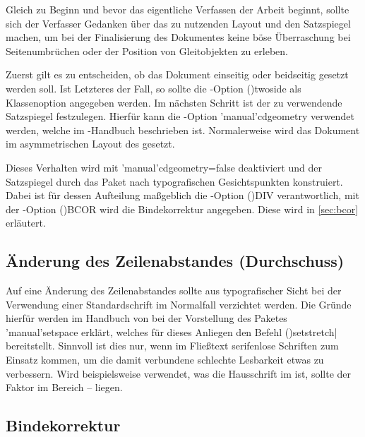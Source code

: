 \documentclass[%
  english,ngerman,%
  cdgeometry=no,DIV=12,%
  cd=false,cdfont=false,cdtitle=true,%
  headings=normal,%
  automark,%
  listof=toc,%
]{tudscrartcl}
\begin{document}
Gleich zu Beginn und bevor das eigentliche Verfassen der Arbeit beginnt, sollte 
sich der Verfasser Gedanken über das zu nutzenden Layout und den Satzspiegel 
machen, um bei der Finalisierung des Dokumentes keine böse Überraschung bei 
Seitenumbrüchen oder der Position von Gleitobjekten zu erleben.

Zuerst gilt es zu entscheiden, ob das Dokument einseitig oder beidseitig 
gesetzt werden soll. Ist Letzteres der Fall, so sollte die \KOMAScript-Option 
\Option(){twoside} als Klassenoption angegeben werden. Im 
nächsten Schritt ist der zu verwendende Satzspiegel festzulegen. Hierfür kann 
die \TUDScript-Option \Option'manual'{cdgeometry} verwendet werden, welche im 
\TUDScript-Handbuch beschrieben ist. Normalerweise wird das Dokument im 
asymmetrischen Layout des \CDs gesetzt.

Dieses Verhalten wird mit \Option*'manual'{cdgeometry=false} deaktiviert und 
der Satzspiegel durch das Paket  nach typografischen 
Gesichtspunkten konstruiert. Dabei ist für dessen Aufteilung maßgeblich die 
\KOMAScript-Option \Option(){DIV} verantwortlich, mit der 
\KOMAScript-Option \Option(){BCOR} wird die Bindekorrektur 
angegeben. Diese wird in \autoref{sec:bcor} erläutert.



\subsection{Änderung des Zeilenabstandes (Durchschuss)}

Auf eine Änderung des Zeilenabstandes sollte aus typografischer Sicht bei der 
Verwendung einer Standardschrift im Normalfall verzichtet werden. Die Gründe 
hierfür werden im Handbuch von \TUDScript bei der Vorstellung des Paketes 
\Package'manual'{setspace} erklärt, welches für dieses Anliegen den Befehl 
\Macro(){setstretch|} bereitstellt. 
Sinnvoll ist dies nur, wenn im Fließtext serifenlose Schriften zum Einsatz 
kommen, um die damit verbundene schlechte Lesbarkeit etwas zu verbessern.
Wird beispielsweise \OpenSans verwendet, was die Hausschrift im \TUDCD ist, 
sollte der Faktor im Bereich \nobreakdashes-- liegen.


\subsection{%
  Bindekorrektur%
  \label{sec:bcor}%
}
\end{document}
